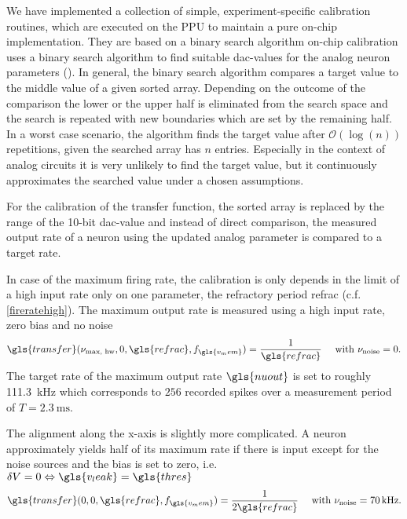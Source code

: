 We have implemented a collection of simple, experiment-specific calibration routines, which are executed on the PPU to maintain a pure on-chip implementation. They are based on a binary search algorithm on-chip calibration uses a binary search algorithm to find suitable \gls{dac}-values for the analog neuron parameters (\citealp{binarysearchsource}). In general, the binary search algorithm compares a target value to the middle value of a given sorted array. Depending on the outcome of the comparison the lower or the upper half is eliminated from the search space and the search is repeated with new boundaries which are set by the remaining half. In a worst case scenario, the algorithm finds the target value after $\mathcal{O}(\log(n))$ repetitions, given the searched array has $n$ entries. Especially in the context of analog circuits it is very unlikely to find the target value, but it continuously approximates the searched value under a chosen assumptions.

For the calibration of the transfer function, the sorted array is replaced by the range of the 10-bit \gls{dac}-value and instead of direct comparison, the measured output rate of a neuron using the updated analog parameter is compared to a target rate.

In case of the maximum firing rate, the calibration is only depends in the limit of a high input rate only on one parameter, the refractory period \gls{refrac} (c.f. \cref{fireratehigh}). The maximum output rate is measured using a high input rate, zero bias and no noise
\begin{equation}
\gls{transfer}(\nu_\text{max, hw}, 0, \gls{refrac}, f_{\gls{v_mem}}) = \frac{1}{\gls{refrac}} \quad \text{ with } \nu_\text{noise} = 0.
\end{equation}
The target rate of the maximum output rate $\gls{nuout}$ is set to roughly \SI{111.3}{\kilo \Hz} which corresponds to $256$ recorded spikes over a measurement period of $T=\SI{2.3}{\milli \s}$.

The alignment along the x-axis is slightly more complicated. A neuron approximately yields half of its maximum rate if there is input except for the noise sources and the bias is set to zero, i.e. $\delta V = 0 \Leftrightarrow \gls{v_leak} = \gls{thres}$
\begin{equation}
\gls{transfer}(0, 0, \gls{refrac}, f_{\gls{v_mem}}) = \frac{1}{2\gls{refrac}} \quad \text{ with } \nu_\text{noise} = \SI{70}{kHz}.
\end{equation}

